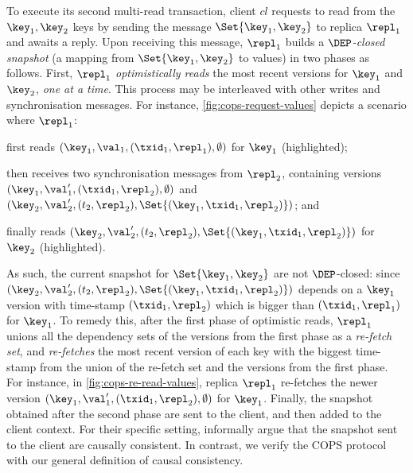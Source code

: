 To execute its second multi-read transaction,
client  \( cl \) requests to read from the $\key_1, \key_2$ keys by sending the message 
\( \Set{\key_1, \key_2} \) to replica $\repl_1$ and awaits a reply.
Upon receiving this message, $\repl_1$ builds a \emph{\( \DEP \)-closed snapshot} (a mapping from $\Set{\key_1, \key_2}$ to values) in two phases as follows. 
First, $\repl_1$ \emph{optimistically reads} the most recent versions for $\key_1$ and $\key_2$,
\emph{one at a time}. 
This process may be interleaved with other writes and synchronisation messages. 
For instance, \cref{fig:cops-request-values} depicts a scenario where \( \repl_1 \):
\begin{enumerate*}
	\item first reads \( (\key_1,\val_1,(\txid_1,\repl_1), \emptyset) \) for $\key_1$ (highlighted); %
	\item then receives two synchronisation messages from \( \repl_2 \), 
containing versions \( ( \key_1, \val'_1, (\txid_1,\repl_2),\emptyset ) \) and \( ( \key_2, \val'_2, (t_2,\repl_2),\Set{(\key_1,\txid_1,\repl_2)} ) \); and
	\item finally reads \( ( \key_2, \val'_2, (t_2,\repl_2),\Set{(\key_1,\txid_1,\repl_2)} ) \) for $\key_2$ (highlighted).
\end{enumerate*}
As such, the current snapshot for \( \Set{\key_1,\key_2}\) are not \( \DEP \)-closed: 
since \( ( \key_2, \val'_2, (t_2,\repl_2),\Set{(\key_1,\txid_1,\repl_2)} ) \) depends on 
a $\key_1$ version with time-stamp $(\txid_1, \repl_2)$ which is bigger than $(\txid_1, \repl_1)$ for $\key_1$.
To remedy this, after the first phase of optimistic reads,
$\repl_1$ unions all the dependency sets of the versions from the first phase as a \emph{re-fetch set},
and \emph{re-fetches}
the most recent version of each key with the biggest time-stamp 
from the union of the re-fetch set and the versions from the first phase.
For instance, in \cref{fig:cops-re-read-values}, replica $\repl_1$ re-fetches 
the newer version \( ( \key_1, \val'_1, (\txid_1,\repl_2),\emptyset ) \) for \( \key_1 \).
Finally, the snapshot obtained after the second phase 
are sent to the client, and then added to the client context.
For their specific setting, \citet{cops} informally argue that the snapshot sent to the client are causally consistent.
In contrast, we verify the COPS protocol with our general definition of causal consistency.


